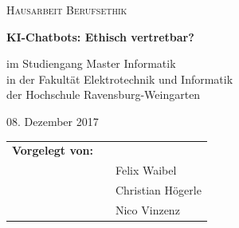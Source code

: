 \begin{figure}[ht]
	\hfill
\end{figure}

\begin{center}
	\textsc{\Large{Hausarbeit Berufsethik\\[1.5cm]}}
\end{center}

\begin{center}
	\LARGE{\textbf{	
			KI-Chatbots: Ethisch vertretbar? \\[2.0cm]
	}}
\end{center}

\begin{center}
	\small{im Studiengang Master Informatik}\\
	\small{in der Fakultät Elektrotechnik und Informatik}\\
	\small{der Hochschule Ravensburg-Weingarten}\\[2.0cm]
\end{center}

\begin{center}
	\large{08. Dezember 2017\\[2.0cm]}
\end{center}

\begin{center}
	\begin{tabular}{lll}
		\textbf{Vorgelegt von:}\\
		 & & Felix Waibel\\
		&& Christian Högerle\\
		&& Nico Vinzenz
	\end{tabular}
\end{center}